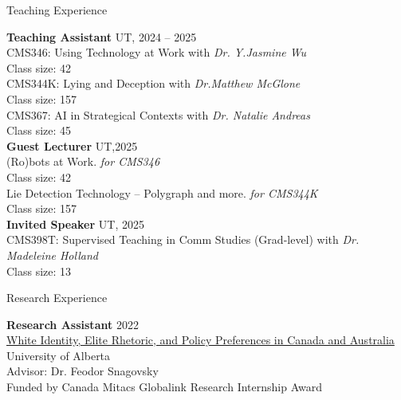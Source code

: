 \documentclass[
	11pt, %
]{resume} %
\begin{document}
\begin{rSection}{Teaching Experience}
	
    \textbf{Teaching Assistant} \hfill UT, 2024 -- 2025 \\ 
    CMS346: Using Technology at Work  with \textit{Dr. Y.Jasmine Wu}\\
    \textbullet\enspace  Class size: 42\\
    CMS344K: Lying and Deception  with \textit{Dr.Matthew McGlone}\\
    \textbullet\enspace  Class size: 157\\
    CMS367:  AI in Strategical Contexts with \textit{Dr. Natalie Andreas}\\
    \textbullet\enspace  Class size: 45\\

    \textbf{Guest Lecturer} \hfill UT,2025\\ 
    (Ro)bots at Work. \textit{for CMS346}\\
    \textbullet\enspace  Class size: 42\\
    Lie Detection Technology – Polygraph and more. \textit{for CMS344K}\\
     \textbullet\enspace  Class size: 157\\

    \textbf{Invited Speaker} \hfill UT, 2025 \\ 
    CMS398T: Supervised Teaching in Comm Studies (Grad-level) with \textit{Dr. Madeleine Holland}\\
     \textbullet\enspace  Class size: 13\\



\end{rSection}


\begin{rSection}{Research Experience}
	
	\textbf{Research Assistant} \hfill 2022\\
    \underline{White Identity, Elite Rhetoric, and Policy Preferences in Canada and Australia} \hfill University of Alberta \\
    {Advisor:} Dr. Feodor Snagovsky \\
\textbullet\enspace Funded by Canada Mitacs Globalink Research Internship Award\\

	
\end{rSection}
\end{document}
